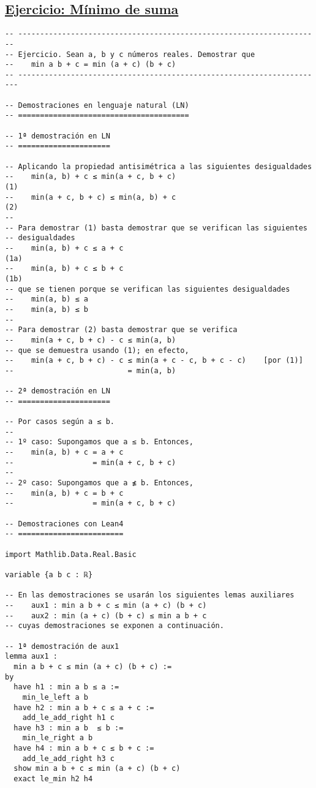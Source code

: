 \subsection{\href{./src/Basicos/Minimo\_de\_suma.lean}{Ejercicio: Mínimo de suma}}
\label{sec:orgbc754b5}
\begin{verbatim}
-- ---------------------------------------------------------------------
-- Ejercicio. Sean a, b y c números reales. Demostrar que
--    min a b + c = min (a + c) (b + c)
-- ----------------------------------------------------------------------

-- Demostraciones en lenguaje natural (LN)
-- =======================================

-- 1ª demostración en LN
-- =====================

-- Aplicando la propiedad antisimétrica a las siguientes desigualdades
--    min(a, b) + c ≤ min(a + c, b + c)                               (1)
--    min(a + c, b + c) ≤ min(a, b) + c                               (2)
--
-- Para demostrar (1) basta demostrar que se verifican las siguientes
-- desigualdades
--    min(a, b) + c ≤ a + c                                          (1a)
--    min(a, b) + c ≤ b + c                                          (1b)
-- que se tienen porque se verifican las siguientes desigualdades
--    min(a, b) ≤ a
--    min(a, b) ≤ b
--
-- Para demostrar (2) basta demostrar que se verifica
--    min(a + c, b + c) - c ≤ min(a, b)
-- que se demuestra usando (1); en efecto,
--    min(a + c, b + c) - c ≤ min(a + c - c, b + c - c)    [por (1)]
--                          = min(a, b)

-- 2ª demostración en LN
-- =====================

-- Por casos según a ≤ b.
--
-- 1º caso: Supongamos que a ≤ b. Entonces,
--    min(a, b) + c = a + c
--                  = min(a + c, b + c)
--
-- 2º caso: Supongamos que a ≰ b. Entonces,
--    min(a, b) + c = b + c
--                  = min(a + c, b + c)

-- Demostraciones con Lean4
-- ========================

import Mathlib.Data.Real.Basic

variable {a b c : ℝ}

-- En las demostraciones se usarán los siguientes lemas auxiliares
--    aux1 : min a b + c ≤ min (a + c) (b + c)
--    aux2 : min (a + c) (b + c) ≤ min a b + c
-- cuyas demostraciones se exponen a continuación.

-- 1ª demostración de aux1
lemma aux1 :
  min a b + c ≤ min (a + c) (b + c) :=
by
  have h1 : min a b ≤ a :=
    min_le_left a b
  have h2 : min a b + c ≤ a + c :=
    add_le_add_right h1 c
  have h3 : min a b  ≤ b :=
    min_le_right a b
  have h4 : min a b + c ≤ b + c :=
    add_le_add_right h3 c
  show min a b + c ≤ min (a + c) (b + c)
  exact le_min h2 h4


\end{verbatim}
